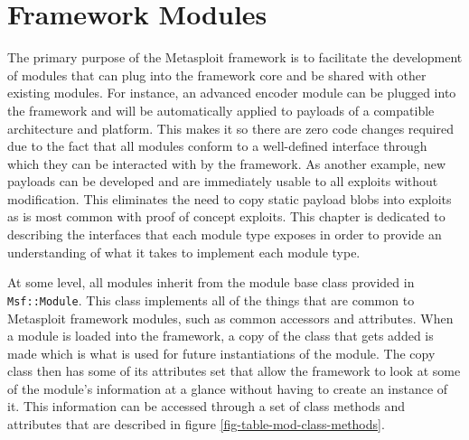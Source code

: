 \documentclass{report}
\begin{document}
\chapter{Framework Modules}
\label{framework-modules}

\par
The primary purpose of the Metasploit framework is to facilitate the
development of modules that can plug into the framework core and be
shared with other existing modules.  For instance, an advanced
encoder module can be plugged into the framework and will be
automatically applied to payloads of a compatible architecture and
platform.  This makes it so there are zero code changes required due
to the fact that all modules conform to a well-defined interface
through which they can be interacted with by the framework.  As
another example, new payloads can be developed and are immediately
usable to all exploits without modification.  This eliminates the
need to copy static payload blobs into exploits as is most common
with proof of concept exploits.  This chapter is dedicated to
describing the interfaces that each module type exposes in order to
provide an understanding of what it takes to implement each module
type.

\par
At some level, all modules inherit from the module base class
provided in \texttt{Msf::Module}.  This class implements all of the
things that are common to Metasploit framework modules, such as
common accessors and attributes.  When a module is loaded into the
framework, a copy of the class that gets added is made which is what
is used for future instantiations of the module.  The copy class
then has some of its attributes set that allow the framework to look
at some of the module's information at a glance without having to
create an instance of it. This information can be accessed through a
set of class methods and attributes that are described in figure
\ref{fig-table-mod-class-methods}.
\end{document}
